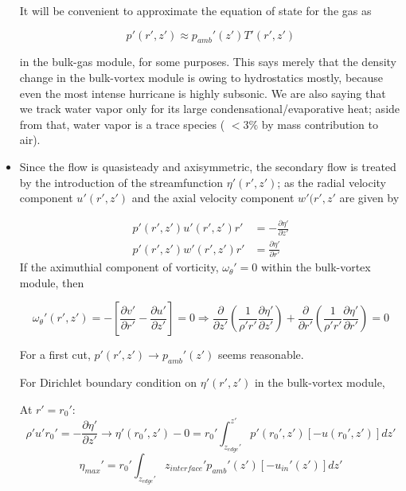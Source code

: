 \documentclass{article}
\begin{document}
\begin{itemize}
It will be convenient to approximate the equation of state for the gas as 

\begin{equation}
	p'(r',z') \approx p_{amb}'(z') T'(r',z')
\end{equation}

in the bulk-gas module, for some purposes. This says merely that the density change in the bulk-vortex module is owing to hydrostatics mostly, because even the most intense hurricane is highly subsonic. We are also saying that we track water vapor only for its large condensational/evaporative heat; aside from that, water vapor is a trace species ( $<3 \%$ by mass contribution to air).

\item Since the flow is quasisteady and axisymmetric, the secondary flow is treated by the introduction of the streamfunction $\eta'(r',z')$; as the radial velocity component $u'(r',z')$ and the axial velocity component $w'(r',z'$ are given by

\begin{equation}
\begin{split}
	p'(r',z')u'(r',z')r' &= -\frac{\partial \eta'}{\partial z'} \\
	p'(r',z')w'(r',z')r' &= \frac{\partial \eta'}{\partial r'}
\end{split}
\end{equation}
If the aximuthial component of vorticity, $\omega_\theta' = 0$ within the bulk-vortex module, then

\begin{equation}
	\omega_\theta'(r',z') = - \left [  \frac{\partial v'}{\partial r'} - \frac{\partial u'}{\partial z'}\right ] = 0 \Rightarrow \frac{\partial}{\partial z'} \left ( \frac{1}{\rho' r'} \frac{\partial \eta'}{\partial z'} \right ) + \frac{\partial}{\partial r'} \left ( \frac{1}{\rho' r'}\frac{\partial \eta'}{\partial r'} \right ) = 0
\end{equation}

For a first cut, $p'(r',z') \rightarrow p_{amb}'(z')$ seems reasonable.

For Dirichlet boundary condition on $\eta ' (r',z')$ in the bulk-vortex module,

\begin{figure}[h!]
	\centering
	\def\svgwidth{0.7\columnwidth}
	
\end{figure}

At $r' = r_0'$:
\begin{equation}
	\rho' u' r_0' = -\frac{\partial \eta'}{\partial z'} \rightarrow \eta'(r_0', z') - 0 = r_0' \int_{z_{edge}'}^{z'} p'(r_0', z')[- u(r_0', z')] dz'
\end{equation}
\begin{equation}
	\eta_{max}' = r_0' \int_{z_{edge}'}{z_{interface}'} p_{amb}'(z') [-u_{in}'(z') ] dz'
\end{equation}


\end{itemize}
\end{document}
